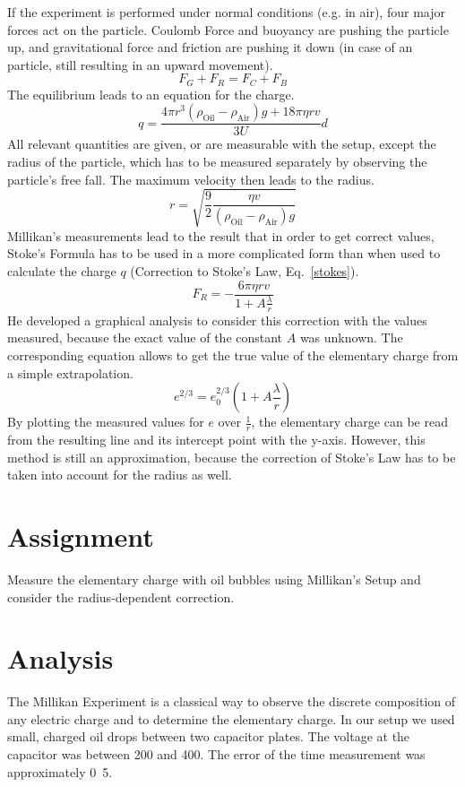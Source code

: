 \documentclass[a4paper,10pt]{article}
\begin{document}
If the experiment is performed under normal conditions (e.g. in air), four major forces act on the particle. Coulomb Force and buoyancy are pushing the particle up, and gravitational force and friction are pushing it down (in case of an particle, still resulting in an upward movement).
\begin{equation}
F_G + F_R = F_C + F_B
\end{equation}
The equilibrium leads to an equation for the charge.
\begin{equation}
q = \frac{4 \pi r^3 (\rho_\text{Oil}-\rho_\text{Air}) g + 18 \pi \eta r v}{3 U} d
\end{equation}
All relevant quantities are given, or are measurable with the setup, except the radius of the particle, which has to be measured separately by observing the particle's free fall. The maximum velocity then leads to the radius.
\begin{equation}
r = \sqrt{\frac{9}{2} \frac{\eta v}{(\rho_\text{Oil}-\rho_\text{Air}) g}}
\end{equation}
Millikan's measurements lead to the result that in order to get correct values, Stoke's Formula has to be used in a more complicated form than when used to calculate the charge $q$ (Correction to Stoke's Law, Eq.~\ref{stokes}).
\begin{equation}
F_R = - \frac{6 \pi \eta r v}{1+A \frac{\lambda}{r}} \label{stokes}
\end{equation}
He developed a graphical analysis to consider this correction with the values measured, because the exact value of the constant $A$ was unknown. The corresponding equation allows to get the true value of the elementary charge from a simple extrapolation.
\begin{equation}
e^{2/3} = e_0^{2/3} \left(1 + A\frac{\lambda}{r}\right)
\end{equation}
By plotting the measured values for $e$ over $\frac{1}{r}$, the elementary charge can be read from the resulting line and its intercept point with the y-axis. However, this method is still an approximation, because the correction of Stoke's Law has to be taken into account for the radius as well.
\section{Assignment}
Measure the elementary charge with oil bubbles using Millikan's Setup and consider the radius-dependent correction.

\clearpage

\section{Analysis}
The Millikan Experiment is a classical way to observe the discrete composition of any electric charge and to determine the elementary charge. In our setup we used small, charged oil drops between two capacitor plates. The voltage at the capacitor was between \unit{200}{\volt} and \unit{400}{\volt}. The error of the time measurement was approximately \unit{0.5}{\second}.
\end{document}
